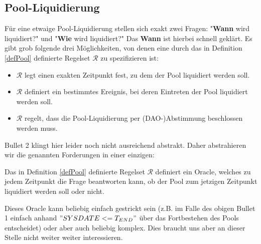 \vspace{0.5cm}

\subsection{Pool-Liquidierung}

\vspace{0.3cm}

Für eine etwaige Pool-Liquidierung stellen sich exakt zwei Fragen: "\textbf{Wann} wird liquidiert?" und "\textbf{Wie} wird liquidiert?" Das \textbf{Wann} ist hierbei schnell geklärt. Es gibt grob folgende drei Möglichkeiten, von denen eine durch das in Definition \ref{defPool} definierte Regelset $\mathcal{R}$ zu spezifizieren ist:

\begin{itemize}
  \item $\mathcal{R}$ legt einen exakten Zeitpunkt fest, zu dem der Pool liquidiert werden soll.
  \item $\mathcal{R}$ definiert ein bestimmtes Ereignis, bei deren Eintreten der Pool liquidiert werden soll.
  \item $\mathcal{R}$ regelt, dass die Pool-Liquidierung per (DAO-)Abstimmung beschlossen werden muss.
\end{itemize}

\vspace{0.3cm}

Bullet 2 klingt hier leider noch nicht ausreichend abstrakt. Daher abstrahieren wir die genannten Forderungen in einer einzigen:

\vspace{0.2cm}

\begin{Fazit}

Das in Definition \ref{defPool} definierte Regelset $\mathcal{R}$ definiert ein Oracle, welches zu jedem Zeitpunkt die Frage beantworten kann, ob der Pool zum jetzigen Zeitpunkt liquidiert werden soll oder nicht. 

Dieses Oracle kann beliebig einfach gestrickt sein (z.B. im Falle des obigen Bullet 1 einfach anhand $"SYSDATE <= T_{END}"$ über das Fortbestehen des Pools entscheidet) oder aber auch beliebig komplex. Dies braucht uns aber an dieser Stelle nicht weiter weiter interessieren. 

\end{Fazit}

\vspace{0.3cm}

